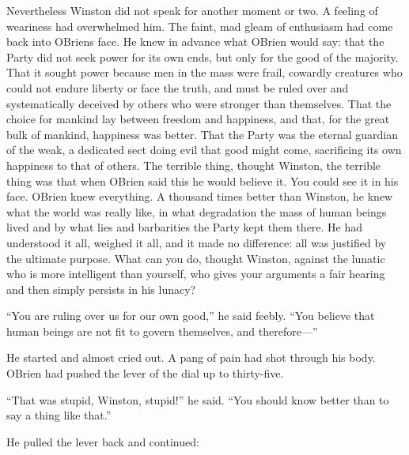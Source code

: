 Nevertheless Winston did not speak for another moment or two. A feeling
of weariness had overwhelmed him. The faint, mad gleam of enthusiasm had
come back into O\textquotesingle Brien\textquotesingle s face. He knew
in advance what O\textquotesingle Brien would say: that the Party did
not seek power for its own ends, but only for the good of the majority.
That it sought power because men in the mass were frail, cowardly
creatures who could not endure liberty or face the truth, and must be
ruled over and systematically deceived by others who were stronger than
themselves. That the choice for mankind lay between freedom and
happiness, and that, for the great bulk of mankind, happiness was
better. That the Party was the eternal guardian of the weak, a dedicated
sect doing evil that good might come, sacrificing its own happiness to
that of others. The terrible thing, thought Winston, the terrible thing
was that when O\textquotesingle Brien said this he would believe it. You
could see it in his face. O\textquotesingle Brien knew everything. A
thousand times better than Winston, he knew what the world was really
like, in what degradation the mass of human beings lived and by what
lies and barbarities the Party kept them there. He had understood it
all, weighed it all, and it made no difference: all was justified by the
ultimate purpose. What can you do, thought Winston, against the lunatic
who is more intelligent than yourself, who gives your arguments a fair
hearing and then simply persists in his lunacy?

``You are ruling over us for our own good,'' he said feebly. ``You believe
that human beings are not fit to govern themselves, and therefore---''

He started and almost cried out. A pang of pain had shot through his
body. O\textquotesingle Brien had pushed the lever of the dial up to
thirty-five.

``That was stupid, Winston, stupid!'' he said. ``You should know better
than to say a thing like that.''

He pulled the lever back and continued:

